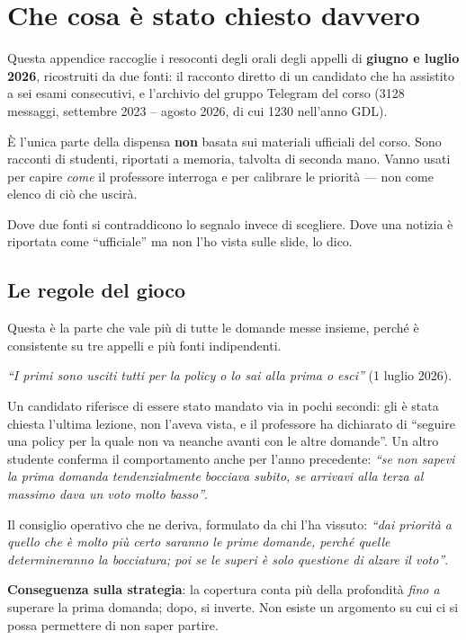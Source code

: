 \chapter{Che cosa è stato chiesto davvero}
\label{ch:appelli}

Questa appendice raccoglie i resoconti degli orali degli appelli di \textbf{giugno e luglio 2026}, ricostruiti da due fonti: il racconto diretto di un candidato che ha assistito a sei esami consecutivi, e l'archivio del gruppo Telegram del corso (3128 messaggi, settembre 2023 -- agosto 2026, di cui 1230 nell'anno GDL).

\begin{tcolorbox}[mywarn, title={Come leggere questa appendice}]
È l'unica parte della dispensa \textbf{non} basata sui materiali ufficiali del corso. Sono racconti di studenti, riportati a memoria, talvolta di seconda mano. Vanno usati per capire \emph{come} il professore interroga e per calibrare le priorità — non come elenco di ciò che uscirà.

Dove due fonti si contraddicono lo segnalo invece di scegliere. Dove una notizia è riportata come ``ufficiale'' ma non l'ho vista sulle slide, lo dico.
\end{tcolorbox}

\section{Le regole del gioco}

Questa è la parte che vale più di tutte le domande messe insieme, perché è consistente su tre appelli e più fonti indipendenti.

\begin{tcolorbox}[mywarn, title={La prima domanda è eliminatoria}]
\emph{``I primi sono usciti tutti per la policy o lo sai alla prima o esci''} (1 luglio 2026).

Un candidato riferisce di essere stato mandato via in pochi secondi: gli è stata chiesta l'ultima lezione, non l'aveva vista, e il professore ha dichiarato di ``seguire una policy per la quale non va neanche avanti con le altre domande''. Un altro studente conferma il comportamento anche per l'anno precedente: \emph{``se non sapevi la prima domanda tendenzialmente bocciava subito, se arrivavi alla terza al massimo dava un voto molto basso''}.

Il consiglio operativo che ne deriva, formulato da chi l'ha vissuto: \emph{``dai priorità a quello che è molto più certo saranno le prime domande, perché quelle determineranno la bocciatura; poi se le superi è solo questione di alzare il voto''}.

\textbf{Conseguenza sulla strategia}: la copertura conta più della profondità \emph{fino a} superare la prima domanda; dopo, si inverte. Non esiste un argomento su cui ci si possa permettere di non saper partire.
\end{tcolorbox}

